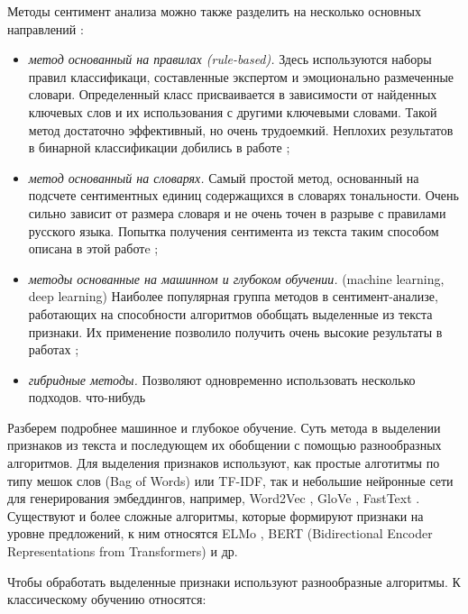 \bigskip\par
Методы сентимент анализа можно также разделить на несколько основных направлений \cite{Semina}:
\bigskip
\begin{itemize}
 \item \textit{метод основанный на правилах (rule-based).} Здесь используются наборы правил классификаци, составленные экспертом и эмоционально размеченные словари. Определенный класс присваивается в зависимости от найденных ключевых слов и их использования с другими ключевыми словами. Такой метод достаточно эффективный, но
 очень трудоемкий. Неплохих результатов в бинарной классификации добились в работе \cite{atex};

 \item \textit{метод основанный на словарях.} Самый простой метод, основанный  на подсчете сентиментных единиц содержащихся в словарях тональности. Очень сильно зависит от размера словаря и не очень точен в разрыве с правилами русского языка. Попытка получения сентимента из текста таким способом описана в этой работe \cite{Kirill};

 \item \textit{методы основанные на машинном и глубоком обучении.} (machine learning, deep learning) Наиболее популярная группа методов в сентимент-анализе, работающих на способности алгоритмов обобщать выделенные из текста признаки. Их применение позволило получить очень высокие результаты в работах \cite{senti1, senti2, senti3, senti4};

 \item \textit{гибридные методы.} Позволяют одновременно использовать несколько подходов. %
что-нибудь
\end{itemize}

\bigskip\par
Разберем подробнее машинное и глубокое обучение. Суть метода в выделении признаков из текста и последующем их
обобщении с помощью разнообразных алгоритмов. Для выделения признаков используют, как простые алготитмы по
типу мешок слов (Bag of Words) или TF-IDF, так и небольшие нейронные сети для генерирования эмбеддингов,
например, Word2Vec \cite{Mikolov:1}, GloVe \cite{glove}, FastText \cite{fasttext}. Существуют и более сложные алгоритмы, которые формируют признаки на уровне предложений, к ним относятся ELMo \cite{elmo1,elmo2}, BERT (Bidirectional Encoder Representations from Transformers) \cite{bert} и др.

\bigskip\par
Чтобы обработать выделенные признаки используют разнообразные алгоритмы. К классическому обучению относятся:

